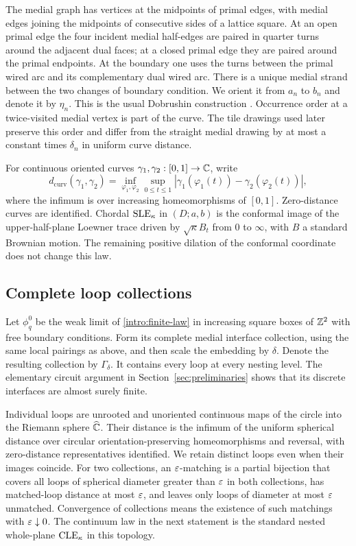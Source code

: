 The medial graph has vertices at the midpoints of primal edges, with
medial edges joining the midpoints of consecutive sides of a lattice
square.  At an open primal edge the four incident medial half-edges are
paired in quarter turns around the adjacent dual faces; at a closed
primal edge they are paired around the primal endpoints.  At the
boundary one uses the turns between the primal wired arc and its
complementary dual wired arc.  There is a unique medial strand between
the two changes of boundary condition.  We orient it from $a_n$ to $b_n$
and denote it by $\eta_n$.  This is the usual Dobrushin construction
\citep[Section~5.2.2]{DC2017Lectures}.  Occurrence order at a twice-visited
medial vertex is part of the curve.  The tile drawings used later preserve
this order and differ from the straight medial drawing by at most a
constant times $\delta_n$ in uniform curve distance.

For continuous oriented curves $\gamma_1,\gamma_2:[0,1]\to\mathbb C$, write
\begin{equation}\label{intro:curve-metric}
 d_{\mathrm{curv}}(\gamma_1,\gamma_2)
 =\inf_{\varphi_1,\varphi_2}
   \sup_{0\le t\le1}
   |\gamma_1(\varphi_1(t))-\gamma_2(\varphi_2(t))|,
\end{equation}
where the infimum is over increasing homeomorphisms of $[0,1]$.
Zero-distance curves are identified.  Chordal $\operatorname{SLE}_\kappa$ in $(D;a,b)$
is the conformal image of the upper-half-plane Loewner trace driven by
$\sqrt\kappa B_t$ from $0$ to $\infty$, with $B$ a standard Brownian
motion.  The remaining positive dilation of the conformal coordinate
does not change this law.

\subsection{Complete loop collections}
\label{intro:collections}

Let $\phi_q^0$ be the weak limit of \eqref{intro:finite-law} in increasing
square boxes of $\mathbb Z^2$ with free boundary conditions.  Form its complete
medial interface collection, using the same local pairings as above, and
then scale the embedding by $\delta$.  Denote the resulting collection
by $\Gamma_\delta$.  It contains every loop at every nesting level.
The elementary circuit argument in Section~\ref{sec:preliminaries}
shows that its discrete interfaces are almost surely finite.

Individual loops are unrooted and unoriented continuous maps of the
circle into the Riemann sphere $\widehat{\mathbb C}$.  Their distance is the
infimum of the uniform spherical distance over circular
orientation-preserving homeomorphisms and reversal, with zero-distance
representatives identified.  We retain distinct loops even when their
images coincide.  For two collections, an $\varepsilon$-matching is a partial
bijection that covers all loops of spherical diameter greater than
$\varepsilon$ in both collections, has matched-loop distance at most $\varepsilon$,
and leaves only loops of diameter at most $\varepsilon$ unmatched.  Convergence
of collections means the existence of such matchings with
$\varepsilon\downarrow0$.  The continuum law in the next statement is the
standard nested whole-plane $\operatorname{CLE}_\kappa$ in this topology.

